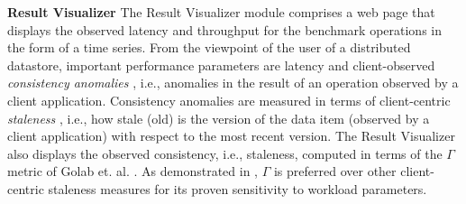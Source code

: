 \documentclass{vldb}
\begin{document}

\par \textbf{Result Visualizer}
The Result Visualizer module comprises a web page that displays the observed latency and throughput for the benchmark operations in the form of a time series.
 From the viewpoint of the user of a distributed datastore, important performance parameters are  latency and client-observed \emph{consistency
anomalies} \cite{Terry:2013:CSL:2517349.2522731}, i.e., anomalies in the result of an operation observed by a client application.  Consistency anomalies are measured in terms of  client-centric \emph{staleness}
  \cite{Terry:2013:CSL:2517349.2522731}, %
   i.e., how stale (old) is the version of
 the data item (observed by a client application) with respect to the most recent version.
    The Result Visualizer also displays the observed consistency, i.e., staleness, computed in terms of the {\boldmath$\Gamma$} metric of Golab et. al. \cite{DBLP:conf/cloud/GolabRAKWG13}. As demonstrated in \cite{DBLP:conf/cloud/GolabRAKWG13}, {\boldmath$\Gamma$}  is preferred over other client-centric staleness measures for its proven sensitivity to workload parameters.
\end{document}
